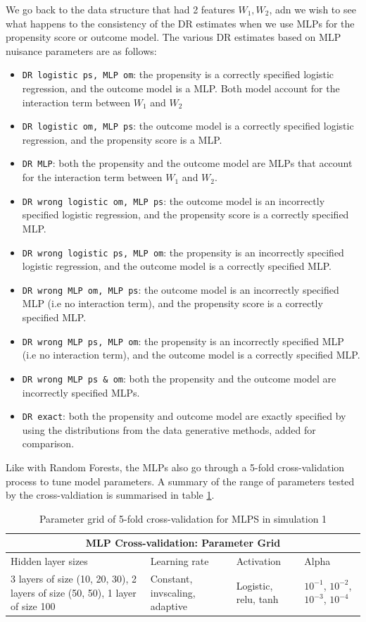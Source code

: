 \documentclass[12pt,twoside]{article}
\begin{document}
We go back to the data structure that had 2 features $W_1,W_2$, adn we wish to see what happens to the consistency of the DR estimates when we use MLPs for the propensity score or outcome model. The various DR estimates based on MLP nuisance parameters are as follows: 
\begin{itemize}
    \item \texttt{DR logistic ps, MLP om}: the propensity is a correctly specified logistic regression, and the outcome model is a MLP. Both model account for the interaction term between $W_1$ and $W_2$
    \item \texttt{DR logistic om, MLP ps}: the outcome model is a correctly specified logistic regression, and the propensity score is a MLP.
    \item \texttt{DR MLP}: both the propensity and the outcome model are MLPs that account for the interaction term between $W_1$ and $W_2$.
    \item \texttt{DR wrong logistic om, MLP ps}: the outcome model is an incorrectly specified logistic regression, and the propensity score is a correctly specified MLP.
    \item \texttt{DR wrong logistic ps, MLP om}: the propensity is an incorrectly specified logistic regression, and the outcome model is a correctly specified MLP.
    \item \texttt{DR wrong MLP om, MLP ps}: the outcome model is an incorrectly specified MLP (i.e no interaction term), and the propensity score is a correctly specified MLP.
    \item \texttt{DR wrong MLP ps, MLP om}: the propensity is an incorrectly specified MLP (i.e no interaction term), and the outcome model is a correctly specified MLP.
    \item \texttt{DR wrong MLP ps \& om}: both the propensity and the outcome model are incorrectly specified MLPs.
    \item \texttt{DR exact}: both the propensity and outcome model are exactly specified by using the distributions from the data generative methods, added for comparison.
\end{itemize}

Like with Random Forests, the MLPs also go through a 5-fold cross-validation process to tune model parameters. A summary of the range of parameters tested by the cross-valdiation is summarised in table \ref{tableMLP}.

\begin{table}[h!]
    \centering
\begin{tabular}{ |p{3cm}|p{3cm}|p{3cm}|p{3cm}| }
 \hline
 \multicolumn{4}{|c|}{MLP Cross-validation: Parameter Grid} \\
 \hline
 Hidden layer sizes & Learning rate & Activation & Alpha\\
 \hline
 3 layers of size (10, 20, 30), 2 layers of size (50, 50), 1 layer of size 100 & Constant, invscaling, adaptive & Logistic, relu, tanh & $10^{-1}$, $10^{-2}$, $10^{-3}$, $10^{-4}$ \\
 \hline 
\end{tabular}
\caption{Parameter grid of 5-fold cross-validation for MLPS in simulation 1}
\label{tableMLP}
\end{table}
\end{document}
